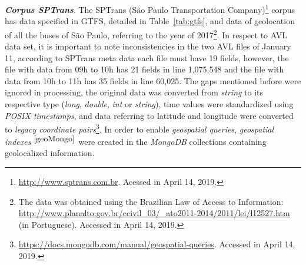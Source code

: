 \documentclass[runningheads]{llncs}
\newcommand{\footref}[1]{%
    $^{\ref{#1}}$%
}
\begin{document}
\textbf{\textit{{Corpus} SPTrans}}. The SPTrans (São Paulo Transportation Company)\footnote{\url{http://www.sptrans.com.br}. Acessed in April 14, 2019.} corpus has data specified in GTFS, detailed in Table~\ref{tab:gtfs}, and data of geolocation of all the buses of São Paulo, referring to the year of 2017\footnote{The data was obtained using the Brazilian Law of Access to Information: \url{http://www.planalto.gov.br/ccivil_03/_ato2011-2014/2011/lei/l12527.htm} (in Portuguese). Accessed in April 14, 2019.}. In respect to AVL data set, it is important to note inconsistencies in the two AVL files of January 11, according to SPTrans meta data each file must have 19 fields, however, the file with data from 09h to 10h has 21 fields in line 1,075,548 and the file with data from 10h to 11h has 35 fields in line 60,025. The gaps mentioned before were ignored in processing, the original data was converted from \textit{string} to its respective type (\textit{long}, \textit {double}, \textit{int} or \textit{string}), time values were standardized using \textit{POSIX timestamps}, and data referring to latitude and longitude were converted to \textit {legacy coordinate pairs}\footnote {\label{geoMongo}\url {https://docs.mongodb.com/manual/geospatial-queries}. Accessed in April 14, 2019.}. In order to enable \textit{geospatial queries}, \textit{geospatial indexes}\footref{geoMongo} were created in the \textit{MongoDB} collections containing geolocalized information.
\end{document}
